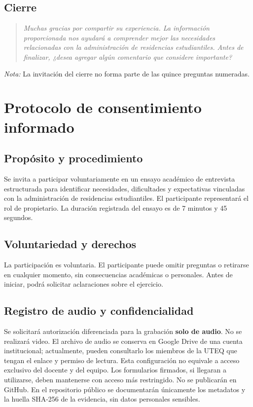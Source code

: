 \documentclass[12pt,a4paper]{article}
\begin{document}
\subsection{Cierre}
\begin{quote}\itshape\color{azul}
Muchas gracias por compartir su experiencia. La información proporcionada nos ayudará a comprender mejor las necesidades relacionadas con la administración de residencias estudiantiles. Antes de finalizar, ¿desea agregar algún comentario que considere importante?
\end{quote}
\textit{Nota:} La invitación del cierre no forma parte de las quince preguntas numeradas.

\section{Protocolo de consentimiento informado}
\subsection{Propósito y procedimiento}
Se invita a participar voluntariamente en un ensayo académico de entrevista estructurada para identificar necesidades, dificultades y expectativas vinculadas con la administración de residencias estudiantiles. El participante representará el rol de propietario. La duración registrada del ensayo es de 7 minutos y 45 segundos.

\subsection{Voluntariedad y derechos}
La participación es voluntaria. El participante puede omitir preguntas o retirarse en cualquier momento, sin consecuencias académicas o personales. Antes de iniciar, podrá solicitar aclaraciones sobre el ejercicio.

\subsection{Registro de audio y confidencialidad}
Se solicitará autorización diferenciada para la grabación \textbf{solo de audio}. No se realizará video. El archivo de audio se conserva en Google Drive de una cuenta institucional; actualmente, pueden consultarlo los miembros de la UTEQ que tengan el enlace y permiso de lectura. Esta configuración no equivale a acceso exclusivo del docente y del equipo. Los formularios firmados, si llegaran a utilizarse, deben mantenerse con acceso más restringido. No se publicarán en GitHub. En el repositorio público se documentarán únicamente los metadatos y la huella SHA-256 de la evidencia, sin datos personales sensibles.
\end{document}
